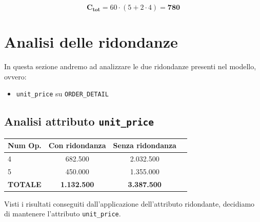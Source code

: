 \documentclass[a4paper,12pt]{report}
\begin{document}
$$\mathbf{C_{tot}} = 60 \cdot (5 + 2 \cdot 4) = \mathbf{780}$$

\section{Analisi delle ridondanze}

In questa sezione andremo ad analizzare le due ridondanze presenti nel modello, ovvero:
\begin{itemize}
  \item \texttt{unit\_price} su \texttt{ORDER\_DETAIL}
\end{itemize}


\subsection{Analisi attributo \texttt{unit\_price}}

\begin{table}[H]
	\centering
	\begin{tabular}{|l|c|c|c|}
	\hline
	\textbf{Num Op.} & \textbf{Con ridondanza} & \textbf{Senza ridondanza} \\
	\hline
	4 & 682.500 & 2.032.500  \\
  \hline
	5 & 450.000 & 1.355.000 \\
  \hline
  \textbf{TOTALE} & \textbf{1.132.500} & \textbf{3.387.500} \\
  \hline
  \end{tabular}
\end{table}

Visti i risultati conseguiti dall'applicazione dell'attributo ridondante, decidiamo di mantenere l'attributo \texttt{unit\_price}.
\end{document}
